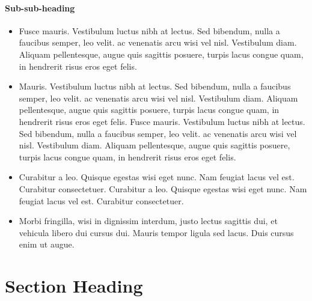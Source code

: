\lipsum[5]


\paragraph{Sub-sub-heading}
\lipsum[5]
\lipsum[5]
\begin{itemize}
\item{}
 Fusce mauris. Vestibulum luctus nibh at lectus. Sed bibendum, nulla a faucibus semper, leo velit. ac venenatis arcu wisi vel nisl. Vestibulum diam. Aliquam pellentesque, augue quis
sagittis posuere, turpis lacus congue quam, in hendrerit risus eros eget felis.
\item{}
Mauris. Vestibulum luctus nibh at lectus. Sed bibendum, nulla a faucibus semper, leo velit. ac venenatis arcu wisi vel nisl. Vestibulum diam. Aliquam pellentesque, augue quis
sagittis posuere, turpis lacus congue quam, in hendrerit risus eros eget felis.  Fusce mauris. Vestibulum luctus nibh at lectus. Sed bibendum, nulla a faucibus semper, leo velit. ac venenatis arcu wisi vel nisl. Vestibulum diam. Aliquam pellentesque, augue quis
sagittis posuere, turpis lacus congue quam, in hendrerit risus eros eget felis.
\item{}
 Curabitur a leo. Quisque egestas wisi eget nunc. Nam feugiat lacus vel
est. Curabitur consectetuer. Curabitur a leo. Quisque egestas wisi eget nunc. Nam feugiat lacus vel
est. Curabitur consectetuer.
\item{}
Morbi fringilla, wisi in dignissim interdum, justo lectus sagittis dui, et vehicula libero dui cursus
dui. Mauris tempor ligula sed lacus. Duis cursus enim ut augue.
\end{itemize}
%
\lipsum[5]

\section{Section Heading}



\lipsum[5]


\begin{extract}
\lipsum[5]
\end{extract}

\lipsum[5]

\lipsum[5]

\lipsum[5]

